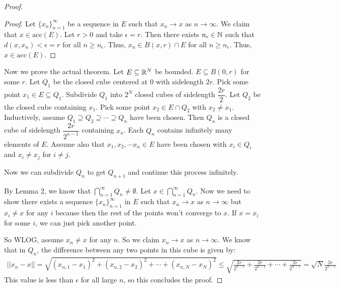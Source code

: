 \documentclass{report}
\begin{document}
\begin{proof}
\begin{proof}
        Let $\{x_n\}_{n=1}^\infty$ be a sequence in $E$ such that $x_n \to x$ as $n \to \infty$. We claim that $x \in \text{acc}(E)$. Let $r >0$ and take $\epsilon = r$. Then there exists $n_\epsilon \in \NN$ such that $d(x, x_n) < \epsilon = r$ for all $n \geq n_\epsilon$. Thus, $x_n \in B(x, r) \cap E$ for all $n \geq n_\epsilon$. Thus, $x \in \text{acc}(E)$.
    \end{proof}
    Now we prove the actual theorem. Let $E \subseteq \RR^N$ be bounded. $E \subseteq B(0, r)$ for some $r$. Let $Q_1$ be the closed cube centered at $0$ with sidelength $2r$. Pick some point $x_1 \in E \subseteq Q_1$. Subdivide $Q_1$ into $2^N$ closed cubes of sidelength $\dfrac{2r}{2}$. Let $Q_2$ be the closed cube containing $x_1$. Pick some point $x_2 \in E \cap Q_2$ with $x_2 \neq x_1$. Inductively, assume $Q_1 \supseteq Q_2 \supseteq \cdots \supseteq Q_n$ have been chosen. Then $Q_{n}$ is a closed cube of sidelength $\dfrac{2r}{2^{n-1}}$ containing $x_n$. Each $Q_n$ contains infinitely many elements of $E$. Assume also that $x_1, x_2, \cdots x_n \in E$ have been chosen with $x_i \in Q_i$ and $x_i \neq x_j$ for $i \neq j$. 

    Now we can subdivide $Q_n$ to get $Q_{n+1}$ and continue this process infinitely.

    By Lemma 2, we know that $\bigcap_{n=1}^\infty Q_n \neq \emptyset$. Let $x \in \bigcap_{n=1}^\infty Q_n$. Now we need to show there exists a sequence $\{x_n\}_{n=1}^\infty$ in $E$ such that $x_n \to x$ as $n \to \infty$ but $x_i \neq x$ for any $i$ because then the rest of the points won't converge to $x$. If $x = x_i$ for some $i$, we can just pick another point.

    So WLOG, assume $x_n \neq x$ for any $n$. So we claim $x_n \to x$ as $n \to \infty$. We know that in $Q_n$, the difference between any two points in this cube is given by:
    \begin{align*}
        ||x_n - x|| = \sqrt{(x_{n, 1} - x_1)^2 + (x_{n, 2} - x_2)^2 + \cdots + (x_{n, N} - x_N)^2} \leq \sqrt{\frac{2r}{2^{n-1}} + \frac{2r}{2^{n-1}} + \cdots + \frac{2r}{2^{n-1}}} = \sqrt{N}\frac{2r}{2^{n-1}}
    \end{align*}
    This value is less than $\epsilon$ for all large $n$, so this concludes the proof.
\end{proof}
\end{document}
